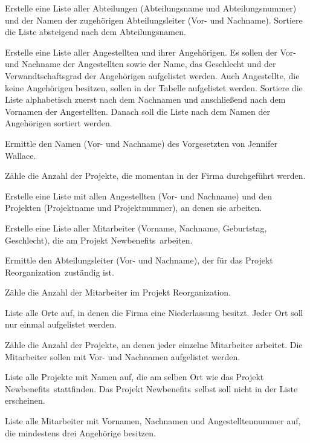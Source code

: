 \begin{compactenum}[a)] 
\item Erstelle eine Liste aller Abteilungen (Abteilungsname und
Abteilungsnummer) und der Namen der zugehörigen Abteilungsleiter (Vor- und
Nachname). Sortiere die Liste absteigend nach dem Abteilungsnamen.

\item Erstelle eine Liste aller Angestellten und ihrer Angehörigen. Es sollen
der Vor- und Nachname der Angestellten sowie der Name, das Geschlecht und der
Verwandtschaftsgrad der Angehörigen aufgelistet werden. Auch Angestellte, die
keine Angehörigen besitzen, sollen in der Tabelle aufgelistet werden.
Sortiere die Liste alphabetisch zuerst nach dem Nachnamen und anschließend nach
dem Vornamen der Angestellten. Danach soll die Liste nach dem Namen der
Angehörigen sortiert werden.

\item Ermittle den Namen (Vor- und Nachname) des Vorgesetzten von Jennifer
Wallace.

\item Zähle die Anzahl der Projekte, die momentan in der Firma durchgeführt
werden.

\item Erstelle eine Liste mit allen Angestellten (Vor- und Nachname) und den
Projekten (Projektname und Projektnummer), an denen sie arbeiten.

\item Erstelle eine Liste aller Mitarbeiter (Vorname, Nachname, Geburtstag,
Geschlecht), die am Projekt \glqq Newbenefits\grqq\ arbeiten.

\item Ermittle den Abteilungsleiter (Vor- und Nachname), der für das Projekt
\glqq Reorganization\grqq\ zuständig ist.

\item Zähle die Anzahl der Mitarbeiter im Projekt \glqq Reorganization\grqq .

\item Liste alle Orte auf, in denen die Firma eine Niederlassung besitzt. Jeder
Ort soll nur einmal aufgelistet werden.

\item Zähle die Anzahl der Projekte, an denen jeder einzelne Mitarbeiter
arbeitet. Die Mitarbeiter sollen mit Vor- und Nachnamen aufgelistet werden.

\item Liste alle Projekte mit Namen auf, die am selben Ort wie das Projekt
\glqq Newbenefits\grqq\ stattfinden. Das Projekt \glqq Newbenefits\grqq\ selbst
soll nicht in der Liste erscheinen.

\item Liste alle Mitarbeiter mit Vornamen, Nachnamen und Angestelltennummer
auf, die mindestens drei Angehörige besitzen.
\end{compactenum}
